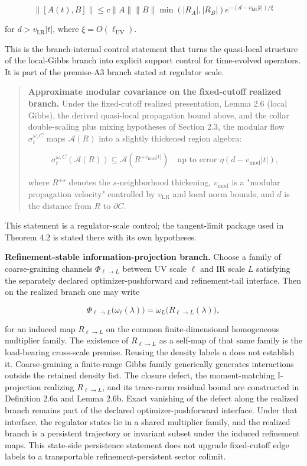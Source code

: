\[
\|[A(t), B]\| \le c \|A\| \|B\| \min(|R_A|, |R_B|) e^{-(d - v_{\mathrm{LR}}|t|)/\xi}
\]

for \(d > v_{\mathrm{LR}}|t|\), where \(\xi = O(\ell_{\mathrm{UV}})\).

This is the branch-internal control statement that turns the quasi-local structure of the
local-Gibbs branch into explicit support control for time-evolved operators. It is part of the
premise-A3 branch stated at regulator scale.

\begin{quote}
\textbf{Approximate modular covariance on the fixed-cutoff realized branch.} Under the fixed-cutoff realized presentation, Lemma 2.6 (local Gibbs), the derived quasi-local propagation bound above, and the collar double-scaling plus mixing hypotheses of Section 2.3, the modular flow \(\sigma_t^{\omega,C}\) maps \(\mathcal{A}(R)\) into a slightly thickened region algebra:

\[
\sigma_t^{\omega,C}(\mathcal{A}(R)) \subseteq \mathcal{A}(R^{+v_{\mathrm{mod}}|t|})
\quad \text{up to error } \eta(d - v_{\mathrm{mod}}|t|),
\]

where \(R^{+s}\) denotes the \(s\)-neighborhood thickening, \(v_{\mathrm{mod}}\) is a "modular propagation velocity" controlled by \(v_{\mathrm{LR}}\) and local norm bounds, and \(d\) is the distance from \(R\) to \(\partial C\).

\end{quote}

This statement is a regulator-scale control; the tangent-limit package used in Theorem 4.2 is stated there with its own hypotheses.

\textbf{Refinement-stable information-projection branch.} Choose a family of coarse-graining channels \(\Phi_{\ell\to L}\) between UV scale \(\ell\) and IR scale \(L\) satisfying the separately declared optimizer-pushforward and refinement-tail interface. Then on the realized branch one may write

\[
\Phi_{\ell\to L}\bigl(\omega_{\ell}(\lambda)\bigr)=\omega_{L}\!\bigl(R_{\ell\to L}(\lambda)\bigr),
\]

for an induced map \(R_{\ell\to L}\) on the common finite-dimensional homogeneous multiplier family. The existence of \(R_{\ell\to L}\) as a self-map of that same family is the load-bearing cross-scale premise. Reusing the density labels \(a\) does not establish it. Coarse-graining a finite-range Gibbs family generically generates interactions outside the retained density list. The closure defect, the moment-matching I-projection realizing \(R_{\ell\to L}\), and its trace-norm residual bound are constructed in Definition 2.6a and Lemma 2.6b. Exact vanishing of the defect along the realized branch remains part of the declared optimizer-pushforward interface. Under that interface, the regulator states lie in a shared multiplier family, and the realized branch is a persistent trajectory or invariant subset under the induced refinement maps. This state-side persistence statement does not upgrade fixed-cutoff edge labels to a transportable refinement-persistent sector colimit.

